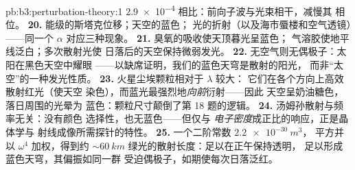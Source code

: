 \begin{solution}{pb:b3:perturbation-theory:1}
\num{2.9e-4} 相比：前向子波与光束相干，减慢其
相位。
\textbf{20.} 能级的斯塔克位移；天空的蓝色；
光的折射（以及海市蜃楼和空气透镜）——同一个
$\alpha$ 对应三种现象。
\textbf{21.} 臭氧的吸收使天顶暮光呈蓝色；
气溶胶使地平线泛白；多次散射光使
日落后的天空保持微弱发光。
\textbf{22.} 无空气则无偶极子：太阳在黑色天空中耀眼
——以缺席证明，我们的蓝色天穹是散射的阳光，
而非“太空”的一种发光性质。
\textbf{23.} 火星尘埃颗粒相对于 $\lambda$ 较大：
它们在各个方向上高效散射红光（使天空
染色），而蓝光最强烈地\emph{向前}衍射——因此
天空呈奶油糖色，落日周围的光晕为
蓝色：颗粒尺寸颠倒了第 18 题的逻辑。
\textbf{24.} 汤姆孙散射与频率无关：没有颜色
选择性，也无蓝色——但仅与
\emph{电子密度}成正比的响应，正是晶体学与
射线成像所需探针的特性。
\textbf{25.} 一个二阶常数 $\qty{2.2e-30}{m^3}$，
平方并以 $\omega^4$ 加权，得到约 $\sim\qty{60}{km}$
绿光的散射长度：足以在正午保持透明，
足以形成蓝色天穹，其偏振如同一群
受迫偶极子，如期使每次日落泛红。
\end{solution}
